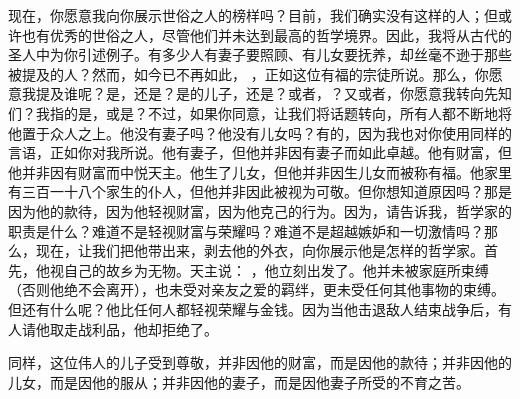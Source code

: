 现在，你愿意我向你展示世俗之人的榜样吗？目前，我们确实没有这样的人；但或许也有优秀的世俗之人，尽管他们并未达到最高的哲学境界。因此，我将从古代的圣人中为你引述例子。有多少人有妻子要照顾、有儿女要抚养，却丝毫不逊于那些被提及的人？然而，如今已不再如此，  ，正如这位有福的宗徒所说。那么，你愿意我提及谁呢？是，还是？是的儿子，还是？或者，？又或者，你愿意我转向先知们？我指的是，或是？不过，如果你同意，让我们将话题转向，所有人都不断地将他置于众人之上。他没有妻子吗？他没有儿女吗？有的，因为我也对你使用同样的言语，正如你对我所说。他有妻子，但他并非因有妻子而如此卓越。他有财富，但他并非因有财富而中悦天主。他生了儿女，但他并非因生儿女而被称有福。他家里有三百一十八个家生的仆人，但他并非因此被视为可敬。但你想知道原因吗？那是因为他的款待，因为他轻视财富，因为他克己的行为。因为，请告诉我，哲学家的职责是什么？难道不是轻视财富与荣耀吗？难道不是超越嫉妒和一切激情吗？那么，现在，让我们把他带出来，剥去他的外衣，向你展示他是怎样的哲学家。首先，他视自己的故乡为无物。天主说：  ，他立刻出发了。他并未被家庭所束缚（否则他绝不会离开），也未受对亲友之爱的羁绊，更未受任何其他事物的束缚。但还有什么呢？他比任何人都轻视荣耀与金钱。因为当他击退敌人结束战争后，有人请他取走战利品，他却拒绝了。\par

同样，这位伟人的儿子受到尊敬，并非因他的财富，而是因他的款待；并非因他的儿女，而是因他的服从；并非因他的妻子，而是因他妻子所受的不育之苦。\par

